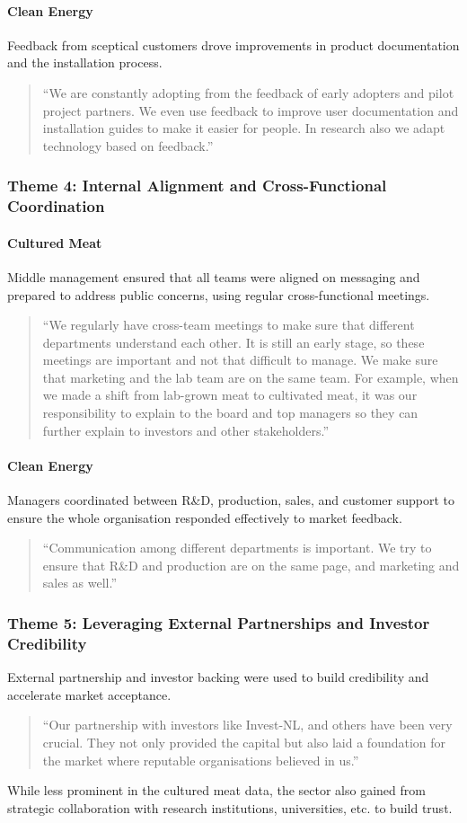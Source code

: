 \paragraph{Clean Energy}
Feedback from sceptical customers drove improvements in product documentation and the installation process.
\begin{quote}
	“We are constantly adopting from the feedback of early adopters and pilot project partners. We even use feedback to improve user documentation and installation guides to make it easier for people. In research also we adapt technology based on feedback.”
\end{quote}

\subsubsection*{Theme 4: Internal Alignment and Cross-Functional Coordination}
\paragraph{Cultured Meat}
Middle management ensured that all teams were aligned on messaging and prepared to address public concerns, using regular cross-functional meetings.
\begin{quote}
	“We regularly have cross-team meetings to make sure that different departments understand each other. It is still an early stage, so these meetings are important and not that difficult to manage. We make sure that marketing and the lab team are on the same team. For example, when we made a shift from lab-grown meat to cultivated meat, it was our responsibility to explain to the board and top managers so they can further explain to investors and other stakeholders.”
\end{quote}

\paragraph{Clean Energy}
Managers coordinated between R\&D, production, sales, and customer support to ensure the whole organisation responded effectively to market feedback.
\begin{quote}
	“Communication among different departments is important. We try to ensure that R\&D and production are on the same page, and marketing and sales as well.”
\end{quote}

\subsubsection*{Theme 5: Leveraging External Partnerships and Investor Credibility}
External partnership and investor backing were used to build credibility and accelerate market acceptance.
\begin{quote}
	“Our partnership with investors like Invest-NL, and others have been very crucial. They not only provided the capital but also laid a foundation for the market where reputable organisations believed in us.”
\end{quote}
While less prominent in the cultured meat data, the sector also gained from strategic collaboration with research institutions, universities, etc. to build trust.

